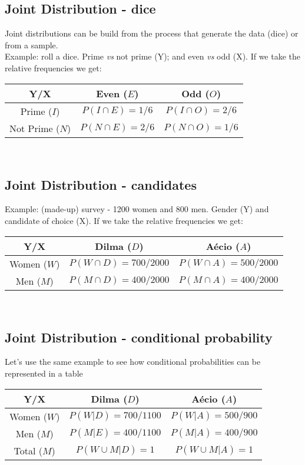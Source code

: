 \documentclass[11pt]{article}
\begin{document}
	\subsection*{Joint Distribution - dice}
	Joint distributions can be build from the process that generate the data (dice) or from a sample.
	\newline\\
	Example: roll a dice. Prime \emph{vs} not prime (Y); and even \emph{vs} odd (X). If we take the relative frequencies we get:\newline\\
	\begin{tabular}{|c|cc|}
\hline
	Y/X & Even ($E$) & Odd ($O$)\\
\hline
	Prime ($I$) & $P(I \cap E) = 1/6$ & $P(I \cap O) = 2/6$\\
	Not Prime ($N$) & $P(N \cap E) = 2/6$ & $P(N \cap O)= 1/6$ \\
\hline
\end{tabular}\newline\\


	\subsection*{Joint Distribution - candidates}


	Example: (made-up) survey - 1200 women and 800 men. Gender (Y) and candidate of choice (X). If we take the relative frequencies we get:\newline\\
	\begin{tabular}{|c|cc|}
\hline
	Y/X & Dilma ($D$) & Aécio ($A$)\\
\hline
	Women ($W$) & $P(W \cap D) = 700/2000 $ & $P(W \cap A) = 500/2000$\\
	Men ($M$) & $P(M \cap D) = 400/2000$ & $P(M \cap A)= 400/2000$ \\
\hline
\end{tabular}\newline\\

	\subsection*{Joint Distribution - conditional probability}
	Let's use the same example to see how conditional probabilities can be represented in a table
\newline\\
	\begin{tabular}{|c|cc|}
\hline
	Y/X & Dilma ($D$) & Aécio ($A$)\\
\hline
	Women ($W$) & $P(W|D) = 700/1100 $ & $P(W|A) = 500/900$\\
	Men ($M$) & $P(M|E) = 400/1100$ & $P(M|A)= 400/900$ \\
\hline
	Total ($M$) & $P(W \cup M|D)=1$ & $P(W \cup M|A)=1$ \\
\hline
\end{tabular}\newline\\
\end{document}
